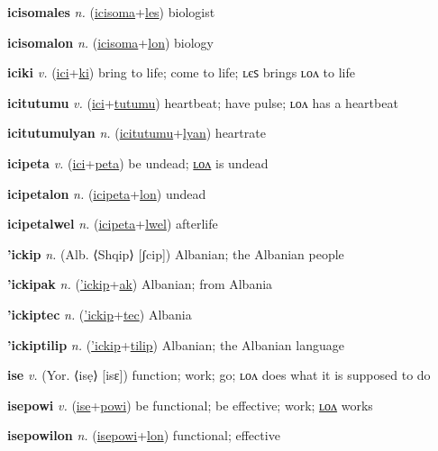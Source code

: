 \textbf{\hypertarget{icisomales}{icisomales}} \textit{n.} (\hyperlink{icisoma}{icisoma}+\allowbreak \hyperlink{les}{les})
biologist

\textbf{\hypertarget{icisomalon}{icisomalon}} \textit{n.} (\hyperlink{icisoma}{icisoma}+\allowbreak \hyperlink{lon}{lon})
biology

\textbf{\hypertarget{iciki}{iciki}} \textit{v.} (\hyperlink{ici}{ici}+\allowbreak \hyperlink{ki}{ki})
bring to life; come to life; ʟєꜱ brings ʟᴏᴧ to life

\textbf{\hypertarget{icitutumu}{icitutumu}} \textit{v.} (\hyperlink{ici}{ici}+\allowbreak \hyperlink{tutumu}{tutumu})
heartbeat; have pulse; ʟᴏᴧ has a heartbeat

\textbf{\hypertarget{icitutumulyan}{icitutumulyan}} \textit{n.} (\hyperlink{icitutumu}{icitutumu}+\allowbreak \hyperlink{lyan}{lyan})
heartrate

\textbf{\hypertarget{icipeta}{icipeta}} \textit{v.} (\hyperlink{ici}{ici}+\allowbreak \hyperlink{peta}{peta})
be undead; \hyperlink{icipetalon}{ʟᴏᴧ} is undead

\textbf{\hypertarget{icipetalon}{icipetalon}} \textit{n.} (\hyperlink{icipeta}{icipeta}+\allowbreak \hyperlink{lon}{lon})
undead

\textbf{\hypertarget{icipetalwel}{icipetalwel}} \textit{n.} (\hyperlink{icipeta}{icipeta}+\allowbreak \hyperlink{lwel}{lwel})
afterlife

\textbf{\hypertarget{'ickip}{'ickip}} \textit{n.} (Alb. ⟨Shqip⟩ [ʃcip])
Albanian; the Albanian people

\textbf{\hypertarget{'ickipak}{'ickipak}} \textit{n.} (\hyperlink{'ickip}{'ickip}+\allowbreak \hyperlink{ak}{ak})
Albanian; from Albania

\textbf{\hypertarget{'ickiptec}{'ickiptec}} \textit{n.} (\hyperlink{'ickip}{'ickip}+\allowbreak \hyperlink{tec}{tec})
Albania

\textbf{\hypertarget{'ickiptilip}{'ickiptilip}} \textit{n.} (\hyperlink{'ickip}{'ickip}+\allowbreak \hyperlink{tilip}{tilip})
Albanian; the Albanian language

\textbf{\hypertarget{ise}{ise}} \textit{v.} (Yor. ⟨isẹ⟩ [isɛ])
function; work; go; ʟᴏᴧ does what it is supposed to do

\textbf{\hypertarget{isepowi}{isepowi}} \textit{v.} (\hyperlink{ise}{ise}+\allowbreak \hyperlink{powi}{powi})
be functional; be effective; work; \hyperlink{isepowilon}{ʟᴏᴧ} works

\textbf{\hypertarget{isepowilon}{isepowilon}} \textit{n.} (\hyperlink{isepowi}{isepowi}+\allowbreak \hyperlink{lon}{lon})
functional; effective

